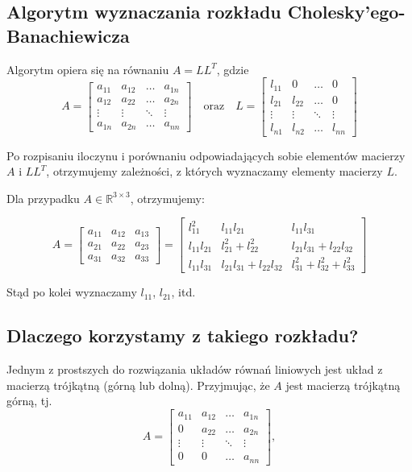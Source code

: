 \documentclass{article}
\begin{document}
\subsection*{Algorytm wyznaczania rozkładu Cholesky'ego-Banachiewicza}

Algorytm opiera się na równaniu \( A = LL^T \), gdzie
\[ A =
\begin{bmatrix}
a_{11} & a_{12} & \dots & a_{1n} \\
a_{12} & a_{22} & \dots & a_{2n} \\
\vdots & \vdots & \ddots & \vdots \\
a_{1n} & a_{2n} & \dots & a_{nn}
\end{bmatrix}
\quad \text{oraz} \quad
L =
\begin{bmatrix}
l_{11} & 0 & \dots & 0 \\
l_{21} & l_{22} & \dots & 0 \\
\vdots & \vdots & \ddots & \vdots \\
l_{n1} & l_{n2} & \dots & l_{nn}
\end{bmatrix}
\]

Po rozpisaniu iloczynu i porównaniu odpowiadających sobie elementów macierzy \( A \) i \( LL^T \), otrzymujemy zależności, z których wyznaczamy elementy macierzy \( L \).

Dla przypadku \( A \in \mathbb{R}^{3 \times 3} \), otrzymujemy:

\[ A =
\begin{bmatrix}
a_{11} & a_{12} & a_{13} \\
a_{21} & a_{22} & a_{23} \\
a_{31} & a_{32} & a_{33}
\end{bmatrix}
=
\begin{bmatrix}
l_{11}^2 & l_{11}l_{21} & l_{11}l_{31} \\
l_{11}l_{21} & l_{21}^2 + l_{22}^2 & l_{21}l_{31} + l_{22}l_{32} \\
l_{11}l_{31} & l_{21}l_{31} + l_{22}l_{32} & l_{31}^2 + l_{32}^2 + l_{33}^2
\end{bmatrix}
\]

Stąd po kolei wyznaczamy \( l_{11} \), \( l_{21} \), itd.

\subsection*{Dlaczego korzystamy z takiego rozkładu?}

Jednym z prostszych do rozwiązania układów równań liniowych jest układ z macierzą
trójkątną (górną lub dolną).
Przyjmując, że \( A \) jest macierzą trójkątną górną, tj.
\[ A =
\begin{bmatrix}
a_{11} & a_{12} & \dots & a_{1n} \\
0 & a_{22} & \dots & a_{2n} \\
\vdots & \vdots & \ddots & \vdots \\
0 & 0 & \dots & a_{nn}
\end{bmatrix}
, \]
\end{document}
